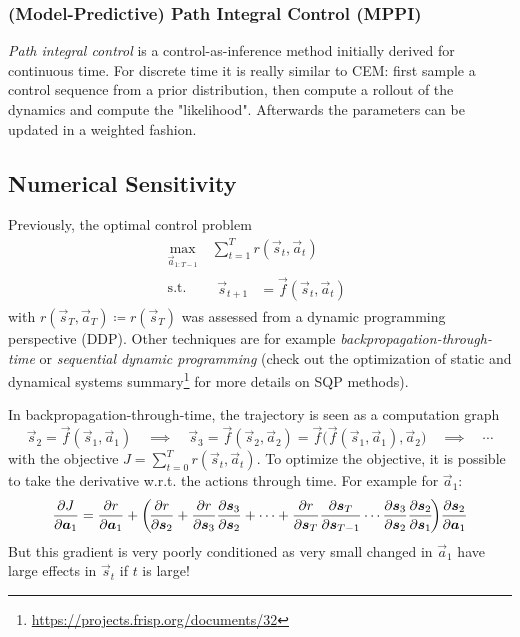 			\subsubsection{(Model-Predictive) Path Integral Control (MPPI)}
				\emph{Path integral control} is a control-as-inference method initially derived for continuous time. For discrete time it is really similar to CEM: first sample a control sequence from a prior distribution, then compute a rollout of the dynamics and compute the "likelihood". Afterwards the parameters can be updated in a weighted fashion.

		\subsection{Numerical Sensitivity}
			Previously, the optimal control problem
			\begin{equation*}
				\begin{aligned}
					\max_{\vec{a}_{1:T - 1}} \, & \sum_{t = 1}^{T} r(\vec{s}_t, \vec{a}_t) \\
					\mathrm{s.t.} \quad         &
					\begin{aligned}
						\vec{s}_{t + 1} & = \vec{f}(\vec{s}_t, \vec{a}_t)
					\end{aligned}
				\end{aligned}
			\end{equation*}
			with \( r(\vec{s}_T, \vec{a}_T) \coloneqq r(\vec{s}_T) \) was assessed from a dynamic programming perspective (DDP). Other techniques are for example \emph{backpropagation-through-time} or \emph{sequential dynamic programming} (check out the optimization of static and dynamical systems summary\footnote{\url{https://projects.frisp.org/documents/32}} for more details on SQP methods).

			In backpropagation-through-time, the trajectory is seen as a computation graph
			\begin{equation*}
				\vec{s}_2 = \vec{f}(\vec{s}_1, \vec{a}_1)
				\quad\implies\quad
				\vec{s}_3 = \vec{f}(\vec{s}_2, \vec{a}_2) = \vec{f}\big(\vec{f}(\vec{s}_1, \vec{a}_1), \vec{a}_2\big)
				\quad\implies\quad
				\cdots
			\end{equation*}
			with the objective \( J = \sum_{t = 0}^{T} r(\vec{s}_t, \vec{a}_t) \). To optimize the objective, it is possible to take the derivative w.r.t. the actions through time. For example for \(\vec{a}_1\):
			\begin{equation*}
				\pdv{J}{\bm{a}_1}
				= \pdv{r}{\bm{a}_1} + \bigg(\! \pdv{r}{\bm{s}_2} + \pdv{r}{\bm{s}_3} \pdv{\bm{s}_3}{\bm{s}_2} + \cdots + \pdv{r}{\bm{s}_T} \pdv{\bm{s}_T}{\bm{s}_{T - 1}} \cdots \pdv{\bm{s}_3}{\bm{s}_2} \pdv{\bm{s}_2}{\bm{s}_1} \!\bigg) \pdv{\bm{s}_2}{\bm{a}_1}
			\end{equation*}
			But this gradient is very poorly conditioned as very small changed in \(\vec{a}_1\) have large effects in \(\vec{s}_t\) if \(t\) is large!

